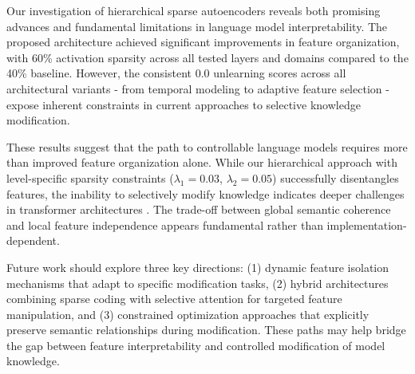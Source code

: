 \documentclass{article} %
\begin{document}
Our investigation of hierarchical sparse autoencoders reveals both promising advances and fundamental limitations in language model interpretability. The proposed architecture achieved significant improvements in feature organization, with 60\% activation sparsity across all tested layers and domains compared to the 40\% baseline. However, the consistent 0.0 unlearning scores across all architectural variants - from temporal modeling to adaptive feature selection - expose inherent constraints in current approaches to selective knowledge modification.

These results suggest that the path to controllable language models requires more than improved feature organization alone. While our hierarchical approach with level-specific sparsity constraints ($\lambda_1=0.03$, $\lambda_2=0.05$) successfully disentangles features, the inability to selectively modify knowledge indicates deeper challenges in transformer architectures \cite{vaswani2017attention}. The trade-off between global semantic coherence and local feature independence appears fundamental rather than implementation-dependent.

Future work should explore three key directions: (1) dynamic feature isolation mechanisms that adapt to specific modification tasks, (2) hybrid architectures combining sparse coding with selective attention for targeted feature manipulation, and (3) constrained optimization approaches that explicitly preserve semantic relationships during modification. These paths may help bridge the gap between feature interpretability and controlled modification of model knowledge.



\end{document}

